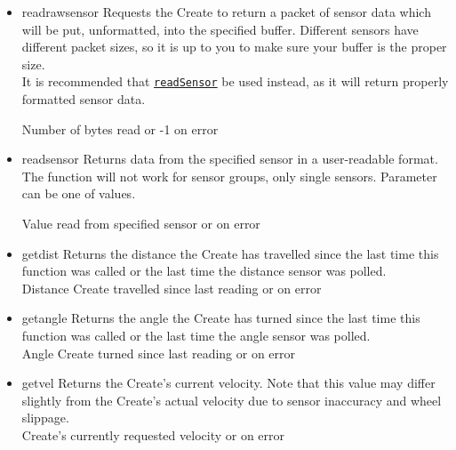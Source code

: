 \documentclass {article}
\begin{document}
\begin {itemize}
  \item {} {readrawsensor}
        Requests the Create to return a packet of sensor data which will be put, unformatted, into
        the specified buffer.  Different sensors have different packet sizes, so it is up to you to
        make sure your buffer is the proper size. \\
        It is recommended that \hyperlink {readsensor}{{\tt readSensor}} be used instead, as it will
        return properly formatted sensor data. \\
        \ret Number of bytes read or -1 on error

  \item {} {readsensor}
        Returns data from the specified sensor in a user-readable format.  The function will not
        work for sensor groups, only single sensors.  Parameter can be one of \oisensor values. \\
        \ret Value read from specified sensor or \fail on error

  \item {} {getdist}
        Returns the distance the Create has travelled since the last time this function was called
        or the last time the distance sensor was polled. \\
        \ret Distance Create travelled since last reading or \fail on error

  \item {} {getangle}
        Returns the angle the Create has turned since the last time this function was called or the
        last time the angle sensor was polled. \\
        \ret Angle Create turned since last reading or \fail on error

  \item {} {getvel}
        Returns the Create's current velocity.  Note that this value may differ slightly from the
        Create's actual velocity due to sensor inaccuracy and wheel slippage. \\
        \ret Create's currently requested velocity or \fail on error


\end{itemize}
\end{document}
